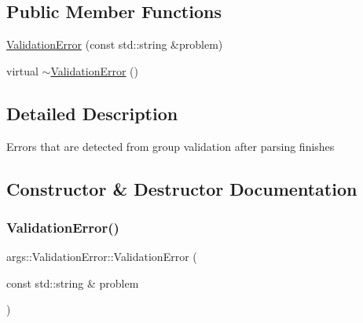 \subsection*{Public Member Functions}
\begin{DoxyCompactItemize}
\item 
\hyperlink{classargs_1_1_validation_error_a5686e974a3677253bb70aa91462a0f90}{Validation\+Error} (const std\+::string \&problem)
\item 
virtual \hyperlink{classargs_1_1_validation_error_ac0cd0dfdd47efd7f3b4b3cdb8dbebd8f}{$\sim$\+Validation\+Error} ()
\end{DoxyCompactItemize}


\subsection{Detailed Description}
Errors that are detected from group validation after parsing finishes 

\subsection{Constructor \& Destructor Documentation}
\mbox{\label{classargs_1_1_validation_error_a5686e974a3677253bb70aa91462a0f90}} 
\subsubsection{\texorpdfstring{Validation\+Error()}{ValidationError()}}
{\footnotesize\ttfamily args\+::\+Validation\+Error\+::\+Validation\+Error (\begin{DoxyParamCaption}\item[{const std\+::string \&}]{problem }\end{DoxyParamCaption})\hspace{0.3cm}{\ttfamily [inline]}}

\mbox{\label{classargs_1_1_validation_error_ac0cd0dfdd47efd7f3b4b3cdb8dbebd8f}} 
